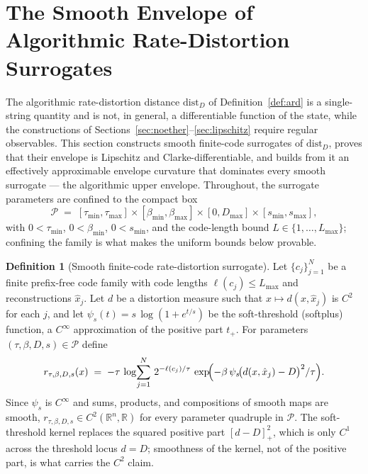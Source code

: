 \documentclass[11pt,a4paper]{article}
\theoremstyle{plain}
\theoremstyle{definition}
\newtheorem{definition}[theorem]{Definition}
\theoremstyle{remark}
\newcommand{\RR}{\mathbb{R}}
\newcommand{\distD}{\mathrm{dist}_{D}}
\begin{document}

\section{The Smooth Envelope of Algorithmic Rate-Distortion
Surrogates}\label{sec:smooth-envelope}

The algorithmic rate-distortion distance $\distD$ of
Definition~\ref{def:ard} is a single-string quantity and is not, in
general, a differentiable function of the state, while the
constructions of Sections~\ref{sec:noether}--\ref{sec:lipschitz}
require regular observables. This section constructs smooth
finite-code surrogates of $\distD$, proves that their envelope is
Lipschitz and Clarke-differentiable, and builds from it an
effectively approximable envelope curvature that dominates every
smooth surrogate --- the algorithmic upper envelope. Throughout, the
surrogate parameters are confined to the compact box
\[
\mathcal{P} \;=\; [\tau_{\min}, \tau_{\max}] \times
[\beta_{\min}, \beta_{\max}] \times [0, D_{\max}] \times
[s_{\min}, s_{\max}],
\]
with $0 < \tau_{\min}$, $0 < \beta_{\min}$, $0 < s_{\min}$, and the
code-length bound $L \in \{1, \dots, L_{\max}\}$; confining the
family is what makes the uniform bounds below provable.

\begin{definition}[Smooth finite-code rate-distortion surrogate]
\label{def:ard-surrogate}
Let $\{c_j\}_{j=1}^N$ be a finite prefix-free code family with code
lengths $\ell(c_j) \le L_{\max}$ and reconstructions $\hat x_j$. Let
$d$ be a distortion measure such that $x \mapsto d(x, \hat x_j)$ is
$C^2$ for each $j$, and let $\psi_s(t) = s\,\log(1 + e^{t/s})$ be the
soft-threshold (softplus) function, a $C^\infty$ approximation of
the positive part $t_+$. For parameters $(\tau, \beta, D, s) \in
\mathcal{P}$ define
\begin{equation}\label{eq:ard-surrogate}
  r_{\tau,\beta,D,s}(x) \;=\; -\tau\,\log\!\sum_{j=1}^{N}\,
  2^{-\ell(c_j)/\tau}\,
  \exp\!\Bigl(-\beta\,\psi_s\!\bigl(d(x, \hat x_j) - D\bigr)^{2}/\tau\Bigr).
\end{equation}
Since $\psi_s$ is $C^\infty$ and sums, products, and compositions of
smooth maps are smooth, $r_{\tau,\beta,D,s} \in C^2(\RR^n, \RR)$ for
every parameter quadruple in $\mathcal{P}$. The soft-threshold kernel
replaces the squared positive part $[d - D]_+^2$, which is only $C^1$
across the threshold locus $d = D$; smoothness of the kernel, not of
the positive part, is what carries the $C^2$ claim.
\end{definition}
\end{document}
